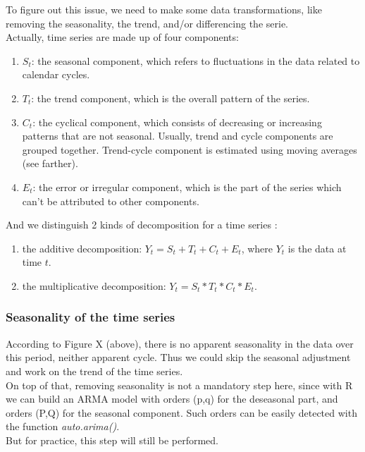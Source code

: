 To figure out this issue, we need to make some data transformations, like removing the seasonality, the trend, and/or differencing the serie. \\

Actually, time series are made up of four components:
\begin{enumerate}
  \item $S_t$: the seasonal component, which refers to fluctuations in the data related to calendar cycles.
  \item $T_t$: the trend component, which is the overall pattern of the series.
  \item $C_t$: the cyclical component, which consists of decreasing or increasing patterns that are not seasonal. Usually, trend and cycle components are grouped together. Trend-cycle component is estimated using moving averages (see farther).
  \item $E_t$: the error or irregular component, which is the part of the series which can't be attributed to other components.
\end{enumerate}
And we distinguish 2 kinds of decomposition for a time series :
\begin{enumerate}
  \item the additive decomposition: $Y_t = S_t + T_t + C_t + E_t$, where $Y_t$ is the data at time $t$.
  \item the multiplicative decomposition: $Y_t = S_t * T_t * C_t * E_t$.
\end{enumerate}

\subsubsection{Seasonality of the time series}
According to Figure X (above), there is no apparent seasonality in the data over this period, neither apparent cycle. Thus we could skip the seasonal adjustment and work on the trend of the time series. \\
On top of that, removing seasonality is not a mandatory step here, since with R we can build an ARMA model with orders (p,q) for the deseasonal part, and orders (P,Q) for the seasonal component. Such orders can be easily detected with the function \textit{auto.arima()}. \\
But for practice, this step will still be performed.

